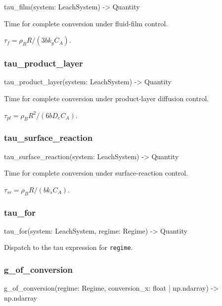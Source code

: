 \documentclass[10pt,a4paper,twoside]{report}
\begin{document}
\begin{verbatimsmall}
tau_film(system: LeachSystem) -> Quantity
\end{verbatimsmall}

Time for complete conversion under fluid-film control.

$\tau_f = \rho_B R / (3 b k_g C_A)$.

\subsubsection*{tau\_product\_layer}

\begin{verbatimsmall}
tau_product_layer(system: LeachSystem) -> Quantity
\end{verbatimsmall}

Time for complete conversion under product-layer diffusion control.

$\tau_{pl} = \rho_B R^2 / (6 b D_e C_A)$.

\subsubsection*{tau\_surface\_reaction}

\begin{verbatimsmall}
tau_surface_reaction(system: LeachSystem) -> Quantity
\end{verbatimsmall}

Time for complete conversion under surface-reaction control.

$\tau_{sr} = \rho_B R / (b k_s C_A)$.

\subsubsection*{tau\_for}

\begin{verbatimsmall}
tau_for(system: LeachSystem, regime: Regime) -> Quantity
\end{verbatimsmall}

Dispatch to the tau expression for \texttt{regime}.

\subsubsection*{g\_of\_conversion}

\begin{verbatimsmall}
g_of_conversion(regime: Regime, conversion_x: float | np.ndarray) -> np.ndarray
\end{verbatimsmall}
\end{document}
